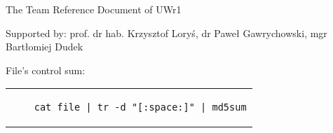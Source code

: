 \documentclass[10pt, a4paper]{amsart}
\begin{document}
  \thispagestyle{fancy}

  \begin{center}

    \Huge
    The Team Reference Document of UWr1

    \par

    \parskip 0.1in

    \Large
    Supported by: prof. dr hab. Krzysztof Loryś, dr Paweł Gawrychowski, mgr Bartłomiej Dudek
    \par

    \parskip 0.1in

  \end{center}

  \begin{multicols}{3}
    \tableofcontents
  \end{multicols}

  \begin{center}

    File's control sum:

    \begin{tabular}{c}
    \begin{lstlisting}
    cat file | tr -d "[:space:]" | md5sum
    \end{lstlisting}
    \end{tabular}

  \end{center}



  \pagebreak
\end{document}
